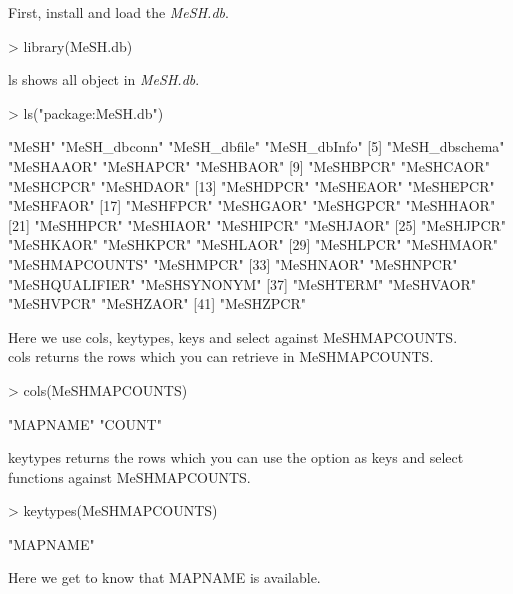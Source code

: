 \documentclass[11pt]{article}
\newcommand{\Rpackage}[1]{{\textit{#1}}}
\begin{document}
First, install and load the \Rpackage{MeSH.db}.
\begin{center}
\begin{Schunk}
\begin{Sinput}
> library(MeSH.db)
\end{Sinput}
\end{Schunk}
\end{center}


ls shows all object in \Rpackage{MeSH.db}.
\begin{center}
\begin{Schunk}
\begin{Sinput}
> ls("package:MeSH.db")
\end{Sinput}
\begin{Soutput}
 [1] "MeSH"          "MeSH_dbconn"   "MeSH_dbfile"   "MeSH_dbInfo"  
 [5] "MeSH_dbschema" "MeSHAAOR"      "MeSHAPCR"      "MeSHBAOR"     
 [9] "MeSHBPCR"      "MeSHCAOR"      "MeSHCPCR"      "MeSHDAOR"     
[13] "MeSHDPCR"      "MeSHEAOR"      "MeSHEPCR"      "MeSHFAOR"     
[17] "MeSHFPCR"      "MeSHGAOR"      "MeSHGPCR"      "MeSHHAOR"     
[21] "MeSHHPCR"      "MeSHIAOR"      "MeSHIPCR"      "MeSHJAOR"     
[25] "MeSHJPCR"      "MeSHKAOR"      "MeSHKPCR"      "MeSHLAOR"     
[29] "MeSHLPCR"      "MeSHMAOR"      "MeSHMAPCOUNTS" "MeSHMPCR"     
[33] "MeSHNAOR"      "MeSHNPCR"      "MeSHQUALIFIER" "MeSHSYNONYM"  
[37] "MeSHTERM"      "MeSHVAOR"      "MeSHVPCR"      "MeSHZAOR"     
[41] "MeSHZPCR"     
\end{Soutput}
\end{Schunk}
\end{center}


Here we use cols, keytypes, keys and select against MeSHMAPCOUNTS.\\

cols returns the rows which you can retrieve in MeSHMAPCOUNTS.
\begin{center}
\begin{Schunk}
\begin{Sinput}
> cols(MeSHMAPCOUNTS)
\end{Sinput}
\begin{Soutput}
[1] "MAPNAME" "COUNT"  
\end{Soutput}
\end{Schunk}
\end{center}


keytypes returns the rows which you can use the option as keys and select functions against MeSHMAPCOUNTS.
\begin{center}
\begin{Schunk}
\begin{Sinput}
> keytypes(MeSHMAPCOUNTS)
\end{Sinput}
\begin{Soutput}
[1] "MAPNAME"
\end{Soutput}
\end{Schunk}
\end{center}
Here we get to know that MAPNAME is available.
\end{document}
